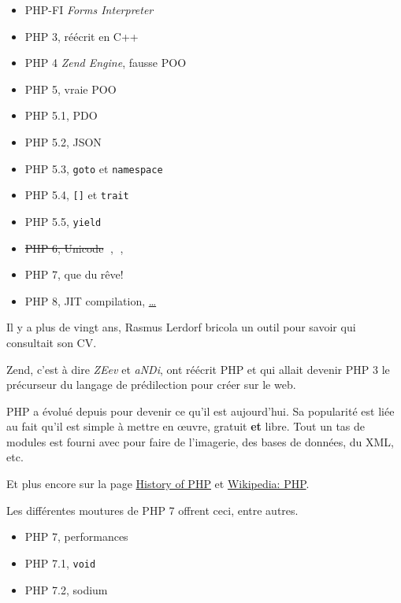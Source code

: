 \begin{itemize}
\tightlist
\item
  PHP-FI \emph{Forms Interpreter}
\item
  PHP 3, réécrit en C++
\item
  PHP 4 \emph{Zend Engine}, fausse POO
\item
  PHP 5, vraie POO
\item
  PHP 5.1, PDO
\item
  PHP 5.2, JSON
\item
  PHP 5.3, \textenglish{\texttt{goto}} et
  \textenglish{\texttt{namespace}}
\item
  PHP 5.4, \textenglish{\texttt{{[}{]}}} et \textenglish{\texttt{trait}}
\item
  PHP 5.5, \textenglish{\texttt{yield}}
\item
  \sout{PHP 6, Unicode} 💩, 🎃, 🐧
\item
  PHP 7, que du rêve!
\item
  PHP 8, JIT compilation,
  \href{https://kinsta.com/fr/blog/php-8/}{\ldots{}}
\end{itemize}

Il y a plus de vingt ans, Rasmus Lerdorf bricola un outil pour savoir
qui consultait son CV.

Zend, c'est à dire \emph{ZEev} et \emph{aNDi}, ont réécrit PHP et qui
allait devenir PHP 3 le précurseur du langage de prédilection pour créer
sur le web.

PHP a évolué depuis pour devenir ce qu'il est aujourd'hui. Sa popularité
est liée au fait qu'il est simple à mettre en œuvre, gratuit \textbf{et}
libre. Tout un tas de modules est fourni avec pour faire de l'imagerie,
des bases de données, du XML, etc.

Et plus encore sur la page
\href{http://php.net/manual/en/history.php.php}{History of PHP} et
\href{https://en.wikipedia.org/wiki/PHP}{Wikipedia: PHP}.

Les différentes moutures de PHP 7 offrent ceci, entre autres.

\begin{itemize}
\tightlist
\item
  PHP 7, performances
\item
  PHP 7.1, \textenglish{\texttt{void}}
\item
  PHP 7.2, sodium
\end{itemize}

